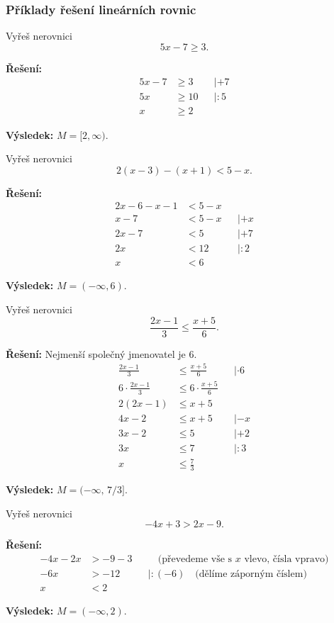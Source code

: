 \documentclass[12pt,a4paper]{article}
\begin{document}
\subsubsection*{Příklady řešení lineárních rovnic}

\begin{examplebox}
Vyřeš nerovnici
\[
5x - 7 \ge 3.
\]

\textbf{Řešení:}
\begin{align*}
5x - 7 &\ge 3 &&| +7\\
5x &\ge 10 &&| :5\\
x &\ge 2
\end{align*}

\noindent
\textbf{Výsledek:} $M = [2,\infty)$.
\end{examplebox}

\newpage
\begin{examplebox}
Vyřeš nerovnici
\[
2(x-3) - (x+1) < 5 - x.
\]

\textbf{Řešení:}
\begin{align*}
2x - 6 - x - 1 &< 5 - x\\
x - 7 &< 5 - x &&| +x\\
2x - 7 &< 5 &&| +7\\
2x &< 12 &&| :2\\
x &< 6
\end{align*}

\noindent
\textbf{Výsledek:} $M = (-\infty,6)$.
\end{examplebox}

\begin{examplebox}
Vyřeš nerovnici
\[
\frac{2x-1}{3} \le \frac{x+5}{6}.
\]

\textbf{Řešení:} Nejmenší společný jmenovatel je $6$.
\begin{align*}
\frac{2x-1}{3} &\le \frac{x+5}{6} &&| \cdot 6\\
6\cdot \frac{2x-1}{3} &\le 6\cdot \frac{x+5}{6}\\
2(2x-1) &\le x+5\\
4x - 2 &\le x + 5 &&| -x\\
3x - 2 &\le 5 &&| +2\\
3x &\le 7 &&| :3\\
x &\le \frac{7}{3}
\end{align*}

\noindent
\textbf{Výsledek:} $M = (-\infty,\,7/3]$.
\end{examplebox}

\begin{examplebox}
Vyřeš nerovnici
\[
-4x + 3 > 2x - 9.
\]

\textbf{Řešení:}
\begin{align*}
-4x - 2x &> -9 - 3 &&\quad \text{(převedeme vše s $x$ vlevo, čísla vpravo)}\\
-6x &> -12 &&| :(-6) \quad \text{(dělíme záporným číslem)}\\
x &< 2
\end{align*}

\noindent
\textbf{Výsledek:} $M = (-\infty,2)$.
\end{examplebox}
\end{document}
